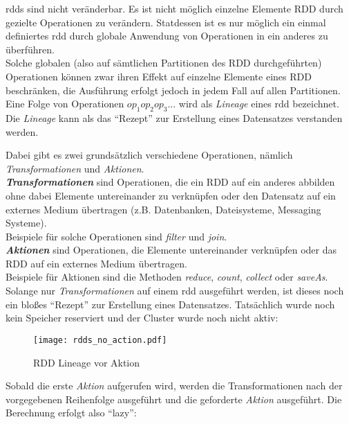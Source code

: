 \Glspl{rdd} sind nicht veränderbar. Es ist nicht möglich einzelne Elemente \gls{RDD} durch gezielte Operationen zu verändern. Statdessen ist es nur möglich ein einmal definiertes \gls{rdd} durch globale Anwendung von Operationen in ein anderes zu überführen.\\
Solche globalen (also auf sämtlichen Partitionen des \gls{RDD} durchgeführten) Operationen können zwar ihren Effekt auf einzelne Elemente eines \gls{RDD} beschränken, die Ausführung erfolgt jedoch in jedem Fall auf allen Partitionen.\\

Eine Folge von Operationen $op_1op_2op_3...$ wird als \textit{Lineage} eines \gls{rdd} bezeichnet. Die \textit{Lineage} kann als das "`Rezept"' zur Erstellung eines Datensatzes verstanden werden.

Dabei gibt es zwei grundsätzlich verschiedene Operationen, nämlich \textit{Transformationen} und \textit{Aktionen}.\\

\textbf{\textit{Transformationen}} sind Operationen, die ein \gls{RDD} auf ein anderes abbilden ohne dabei Elemente untereinander zu verknüpfen oder den Datensatz auf ein externes Medium übertragen (z.B. Datenbanken, Dateisysteme, Messaging Systeme).\\
Beispiele für solche Operationen sind \textit{filter} und \textit{join}.\\

\textbf{\textit{Aktionen}} sind Operationen, die Elemente untereinander verknüpfen oder das \gls{RDD} auf ein externes Medium übertragen.\\
Beispiele für Aktionen sind die Methoden \textit{reduce}, \textit{count}, \textit{collect} oder \textit{saveAs}.\\

Solange nur \textit{Transformationen} auf einem \gls{rdd} ausgeführt werden, ist dieses noch ein bloßes "`Rezept"' zur Erstellung eines Datensatzes. Tatsächlich wurde noch kein Speicher reserviert und der Cluster wurde noch nicht aktiv\cite{Mat12}:\\

\begin{figure}[ht!]
	\centering
  \texttt{[image: rdds\_no\_action.pdf]}
	\caption{RDD Lineage vor Aktion}
	\label{fig:rdds_no_action}
\end{figure}

Sobald die erste \textit{Aktion} aufgerufen wird, werden die Transformationen nach der vorgegebenen Reihenfolge ausgeführt und die geforderte \textit{Aktion} ausgeführt. Die Berechnung erfolgt also "`lazy"':\\


